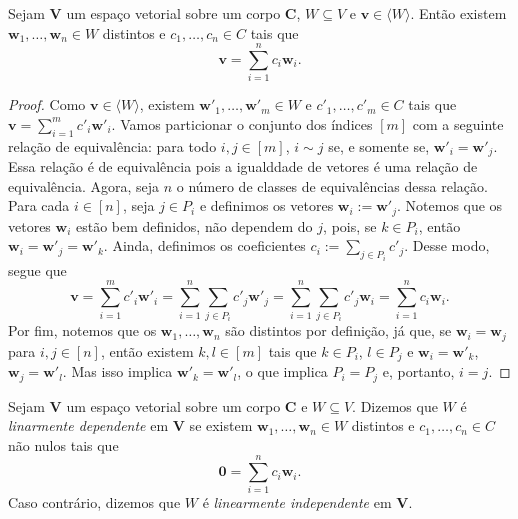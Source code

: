 \begin{prop}
	Sejam $\bm V$ um espaço vetorial sobre um corpo $\bm C$, $W \subseteq V$ e $\bm v \in \langle W \rangle$. Então existem $\bm w_1, \ldots, \bm w_n \in W$ distintos e $c_1, \ldots, c_n \in C$ tais que
	\begin{equation*}
	\bm v = \sum_{i=1}^n c_i \bm w_i.
	\end{equation*}
\end{prop}
\begin{proof}
	Como $\bm v \in \langle W \rangle$, existem $\bm w'_1, \ldots, \bm w'_m \in W$ e $c'_1, \ldots, c'_m \in C$ tais que $\bm v = \sum_{i=1}^m c'_i \bm w'_i$. Vamos particionar o conjunto dos índices $[m]$ com a seguinte relação de equivalência: para todo $i,j \in [m]$, $i \sim j$ se, e somente se, $\bm w'_i = \bm w'_j$. Essa relação é de equivalência pois a igualddade de vetores é uma relação de equivalência. Agora, seja $n$ o número de classes de equivalências dessa relação. Para cada $i \in [n]$, seja $j \in P_i$ e definimos os vetores $\bm w_i := \bm w'_j$. Notemos que os vetores $\bm w_i$ estão bem definidos, não dependem do $j$, pois, se $k \in P_i$, então $\bm w_i = \bm w'_j = \bm w'_k$. Ainda, definimos os coeficientes $c_i := \sum _{j \in P_i} c'_j$. Desse modo, segue que
	\begin{equation*}
	\bm v = \sum_{i=1}^m c'_i \bm w'_i = \sum_{i=1}^n \sum_{j \in P_i} c'_j \bm w'_j = \sum_{i=1}^n \sum_{j \in P_i} c'_j \bm w_i =  \sum_{i=1}^n c_i \bm w_i.
	\end{equation*}
	Por fim, notemos que os $\bm w_1, \ldots, \bm w_n$ são distintos por definição, já que, se $\bm w_i = \bm w_j$ para $i,j \in [n]$, então existem $k,l \in [m]$ tais que $k \in P_i$, $l \in P_j$ e $\bm w_i = \bm w'_k$, $\bm w_j = \bm w'_l$. Mas isso implica $\bm w'_k=\bm w'_l$, o que implica $P_i = P_j$ e, portanto, $i = j$.
\end{proof}

\begin{defi}
	Sejam $\bm V$ um espaço vetorial sobre um corpo $\bm C$ e $W \subseteq V$. Dizemos que $W$ é \emph{linarmente dependente} em $\bm V$ se existem $\bm w_1, \ldots,\bm w_n \in W$ distintos e $c_1,\ldots,c_n \in C$ não nulos tais que
	\begin{equation*}
	\bm 0 = \sum_{i=1}^n c_i \bm w_i.
	\end{equation*}
Caso contrário, dizemos que $W$ é \emph{linearmente independente} em $\bm V$.
\end{defi}

